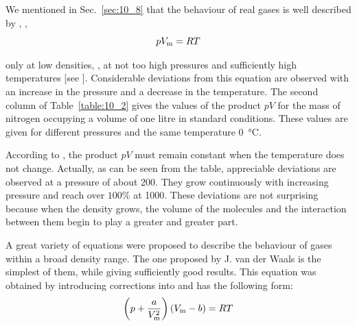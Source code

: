 We mentioned in Sec.~\ref{sec:10_8} that the behaviour of real gases is well described by , \ie,
\begin{equation*}
	pV_{\text{m}} = RT
\end{equation*}

\noindent
only at low densities, \ie, at not too high pressures and sufficiently high temperatures [see ]. Considerable deviations from this equation are observed with an increase in the pressure and a decrease in the temperature. The second column of Table~\ref{table:10_2} gives the values of the product $pV$ for the mass of nitrogen occupying a volume of one litre in standard conditions. These values are given for different pressures and the same temperature \SI{0}{\degreeCelsius}.

\begin{table}[!b]
	\vspace{-0.2cm}
	\renewcommand{\arraystretch}{1.2}
	\caption{ }
	\vspace{-0.6cm}
	\label{table:10_2}
	\begin{center}\end{center}
\end{table}

According to , the product $pV$ must remain constant when the temperature does not change. Actually, as can be seen from the table, appreciable deviations are observed at a pressure of about \SI{200}{\atm}. They grow continuously with increasing pressure and reach over $100$\% at \SI{1000}{\atm}. These deviations are not surprising because when the density grows, the volume of the molecules and the interaction between them begin to play a greater and greater part.

A great variety of equations were proposed to describe the behaviour of gases within a broad density range. The one proposed by J. van der Waals is the simplest of them, while giving sufficiently good results. This equation was obtained by introducing corrections into  and has the following form:
\begin{equation}\label{eq:10_62}
	\left(p+\frac{a}{V_{\text{m}}^2}\right)(V_{\text{m}} - b) = RT
\end{equation}

